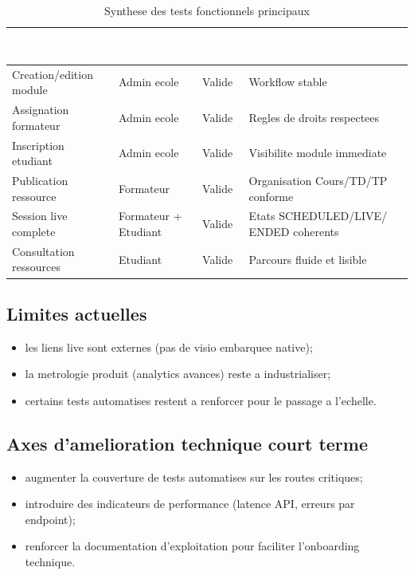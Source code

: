 ﻿﻿\documentclass[12pt,a4paper,oneside]{report}
\begin{document}
\renewcommand{\arraystretch}{1.3}
\begin{table}[H]
\centering
\caption{Synthese des tests fonctionnels principaux}
\label{tab:tests_ch3}
\begin{tabular}{|p{4.3cm}|p{3.2cm}|p{2.4cm}|p{2.6cm}|}
\hline
\rowcolor{ustoblue}
\textcolor{white}{Scenario teste} &
\textcolor{white}{Role principal} &
\textcolor{white}{Statut} &
\textcolor{white}{Observation} \\
\hline
Creation/edition module & Admin ecole & Valide & Workflow stable \\
\hline
Assignation formateur & Admin ecole & Valide & Regles de droits respectees \\
\hline
Inscription etudiant & Admin ecole & Valide & Visibilite module immediate \\
\hline
Publication ressource & Formateur & Valide & Organisation Cours/TD/TP conforme \\
\hline
Session live complete & Formateur + Etudiant & Valide & Etats SCHEDULED/LIVE/ ENDED coherents \\
\hline
Consultation ressources & Etudiant & Valide & Parcours fluide et lisible \\
\hline
\end{tabular}
\end{table}

\subsection{Limites actuelles}

\begin{itemize}
  \item les liens live sont externes (pas de visio embarquee native);
  \item la metrologie produit (analytics avances) reste a industrialiser;
  \item certains tests automatises restent a renforcer pour le passage a l'echelle.
\end{itemize}

\subsection{Axes d'amelioration technique court terme}

\begin{itemize}
  \item augmenter la couverture de tests automatises sur les routes critiques;
  \item introduire des indicateurs de performance (latence API, erreurs par endpoint);
  \item renforcer la documentation d'exploitation pour faciliter l'onboarding technique.
\end{itemize}
\end{document}
